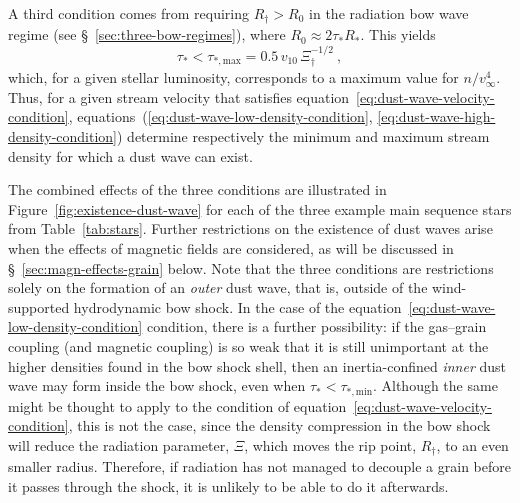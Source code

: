 A third condition comes from requiring \(R_\dag > R_0\) in the radiation
bow wave regime (see \S~\ref{sec:three-bow-regimes}), where
\(R_0 \approx 2 \tau_* R_*\).  This yields
\begin{equation}
  \label{eq:dust-wave-high-density-condition}
  \tau_* < \tau_{*,\text{max}} = 0.5\, v_{10}\, \Xi_\dag^{-1/2} \ , 
\end{equation}
which, for a given stellar luminosity, corresponds to a maximum value
for \(n / v_\infty^4\).  Thus, for a given stream velocity that satisfies
equation~\eqref{eq:dust-wave-velocity-condition},
equations~(\ref{eq:dust-wave-low-density-condition},
\ref{eq:dust-wave-high-density-condition}) determine respectively the
minimum and maximum stream density for which a dust wave can exist.

The combined effects of the three conditions are illustrated in
Figure~\ref{fig:existence-dust-wave} for each of the three example
main sequence stars from Table~\ref{tab:stars}.  Further restrictions
on the existence of dust waves arise when the effects of magnetic
fields are considered, as will be discussed in
\S~\ref{sec:magn-effects-grain} below.  Note that the three conditions
are restrictions solely on the formation of an \textit{outer} dust
wave, that is, outside of the wind-supported hydrodynamic bow shock.
In the case of the equation~\eqref{eq:dust-wave-low-density-condition}
condition, there is a further possibility: if the gas--grain coupling
(and magnetic coupling) is so weak that it is still unimportant at the
higher densities found in the bow shock shell, then an
inertia-confined \textit{inner} dust wave may form inside the bow
shock, even when \(\tau_* < \tau_{*,\text{min}}\).  Although the same might
be thought to apply to the condition of
equation~\eqref{eq:dust-wave-velocity-condition}, this is not the
case, since the density compression in the bow shock will reduce the
radiation parameter, \(\Xi\), which moves the rip point, \(R_\dag\), to an
even smaller radius.  Therefore, if radiation has not managed to
decouple a grain before it passes through the shock, it is unlikely to
be able to do it afterwards.


